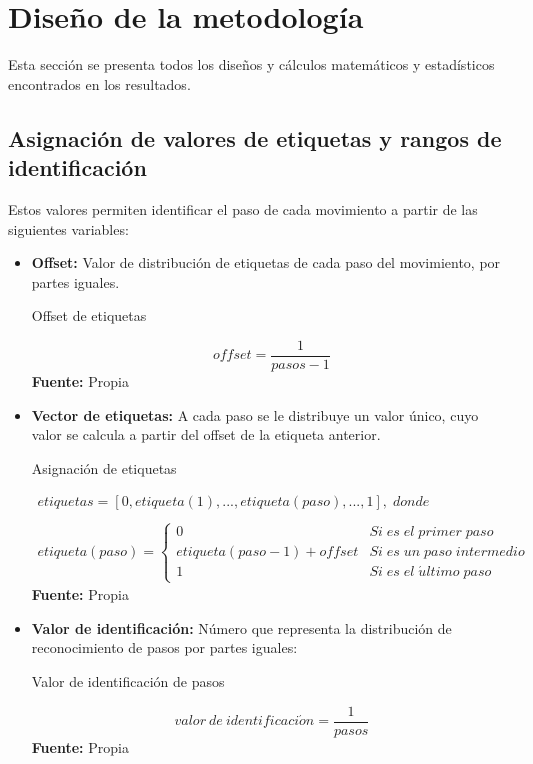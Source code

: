 \section{Dise\~no de la metodolog\'ia}\label{dis}
Esta secci\'on se presenta todos los dise\~nos y c\'alculos matem\'aticos y estad\'isticos encontrados en los resultados. 
\subsection{Asignaci\'on de valores de etiquetas y rangos de identificaci\'on}\label{dis:asig}
Estos valores permiten identificar el paso de cada movimiento a partir de las siguientes variables:
\begin{itemize}
\item \textbf{Offset:} Valor de distribuci\'on de etiquetas de cada paso del movimiento, por partes iguales.
\begin{formula}[H]
	\centering
	\caption{Offset de etiquetas}
	\label{frm:offsetEt}
	\begin{equation}
offset = \frac{1}{pasos-1}
	\end{equation}
	\textbf{Fuente:} Propia
\end{formula}
\item \textbf{Vector de etiquetas:} A cada paso se le distribuye un valor \'unico, cuyo valor se calcula a partir del offset de la etiqueta anterior.
\begin{formula}[H]
	\centering
	\caption{Asignaci\'on de etiquetas}
	\label{frm:vecEtiq}
	\begin{equation}
\begin{matrix}
etiquetas=[0, etiqueta(1), ..., etiqueta(paso), ..., 1],\; donde
\\
\\
etiqueta(paso) =
\left\{\begin{matrix}
0 & Si\; es\; el\; primer \; paso
\\
etiqueta(paso-1)+offset & Si\; es\; un\; paso\; intermedio
\\ 
1 & Si\; es\; el\; \acute{u}ltimo\; paso
\end{matrix}\right.
\end{matrix}
	\end{equation}
	\textbf{Fuente:} Propia
\end{formula} 

\item \textbf{Valor de identificaci\'on:} N\'umero que representa la distribuci\'on de reconocimiento  de pasos por partes iguales:
\begin{formula}[H]
	\centering
	\caption{Valor de identificaci\'on de pasos}
	\label{frm:idenStep}
	\begin{equation}
valor \: de \: identificaci\acute{o}n = \frac{1}{pasos}
	\end{equation}
	\textbf{Fuente:} Propia
\end{formula} 


\end{itemize}
